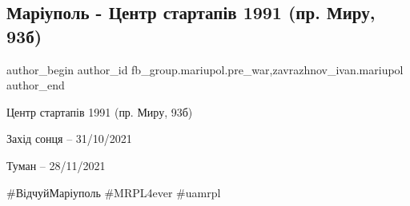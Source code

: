  
 
 
 
 

\subsection{Маріуполь - Центр стартапів 1991 (пр. Миру, 93б)}
\label{sec:19_01_2023.fb.fb_group.mariupol.pre_war.1.mar_upol___tsentr_st}
 
\ifcmt
 author_begin
   author_id fb_group.mariupol.pre_war,zavrazhnov_ivan.mariupol
 author_end
\fi

Центр стартапів 1991 (пр. Миру, 93б)

Захід сонця – 31/10/2021

Туман – 28/11/2021

\#ВідчуйМаріуполь \#MRPL4ever \#uamrpl
